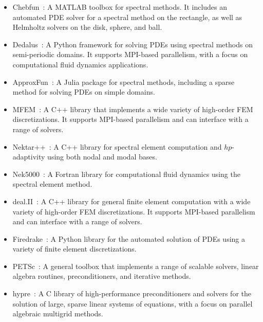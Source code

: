 \begin{itemize}
\item Chebfun~\cite{Chebfun}:  A MATLAB toolbox for spectral methods. It includes an automated PDE solver for a spectral method on the rectangle, as well as Helmholtz solvers on the disk, sphere, and ball.
\item Dedalus~\cite{Dedalus}: A Python framework for solving PDEs using spectral methods on semi-periodic domains. It supports MPI-based parallelism, with a focus on computational fluid dynamics applications.
\item ApproxFun~\cite{ApproxFun}: A Julia package for spectral methods, including a sparse method for solving PDEs on simple domains.
\item MFEM~\cite{MFEM}: A C++ library that implements a wide variety of high-order FEM discretizations. It supports MPI-based parallelism and can interface with a range of solvers.
\item Nektar++~\cite{Nektar,Nektar2}: A C++ library for spectral element computation and $hp$-adaptivity using both nodal and modal bases.
\item Nek5000~\cite{Nek5000}: A Fortran library for computational fluid dynamics using the spectral element method.
\item deal.II~\cite{deal.II}: A C++ library for general finite element computation with a wide variety of high-order FEM discretizations. It supports MPI-based parallelism and can interface with a range of solvers.
\item Firedrake~\cite{Firedrake}: A Python library for the automated solution of PDEs using a variety of finite element discretizations.
\item PETSc~\cite{PETSc_web,PETSc_manual}: A general toolbox that implements a range of scalable solvers, linear algebra routines, preconditioners, and iterative methods.
\item hypre~\cite{hypre}:  A C library of high-performance preconditioners and solvers for the solution of large, sparse linear systems of equations, with a focus on parallel algebraic multigrid methods.
\end{itemize}

